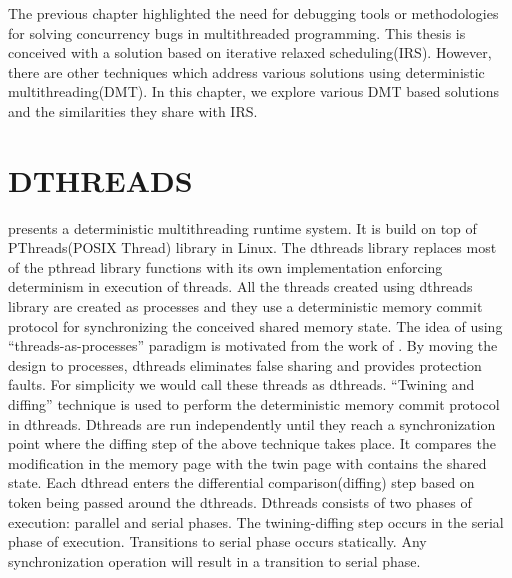 The previous chapter highlighted the need for debugging tools or methodologies for solving concurrency bugs in multithreaded programming. 
This thesis is conceived with a solution based on iterative relaxed scheduling(IRS). 
However, there are other techniques which address various solutions using deterministic multithreading(DMT). 
In this chapter, we explore various DMT based solutions and the similarities they share with IRS. 

\section{DTHREADS}

\citet{dthreads} presents a deterministic multithreading runtime system. 
It is build on top of PThreads(POSIX Thread) library in Linux. 
The dthreads library replaces most of the pthread library functions with its own implementation enforcing determinism in execution of threads. 
All the threads created using dthreads library are created as processes and they use a deterministic memory commit protocol for synchronizing the conceived shared memory state. 
The idea of using ``threads-as-processes'' paradigm is motivated from the work of \citet{grace}. 
By moving the design to processes, dthreads eliminates false sharing and provides protection faults. 
For simplicity we would call these threads as dthreads. 
``Twining and diffing'' technique is used to perform the deterministic  memory commit protocol in dthreads. 
Dthreads are run independently until they reach a synchronization point where the diffing step of the above technique takes place. 
It compares the modification in the memory page with the twin page with contains the shared state. 
Each dthread enters the differential comparison(diffing) step based on token being passed around the dthreads. 
Dthreads consists of two phases of execution: parallel and serial phases. 
The twining-diffing step occurs in the serial phase of execution. 
Transitions to serial phase occurs statically. 
Any synchronization operation will result in a transition to serial phase. 

